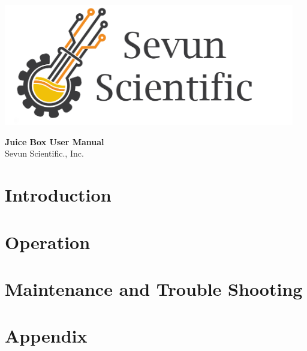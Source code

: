 \documentclass[letterpaper]{article}
\begin{document}
\date{\today}
\begin{titlingpage} %
	\centering
	\includegraphics[width=5in]{ssi_logo.png}
	\vspace{2cm}
\begin{flushleft}
	\begin{Huge}
		\textbf{Juice Box User Manual}\\
		\vspace{5mm}
		Sevun Scientific., Inc.
	\end{Huge}
\end{flushleft}
\vfill
\Large \thedate \par
\end{titlingpage} 

\newpage
\tableofcontents

\newpage
{} %
\setcounter{page}{1}

\section{Introduction}

 
\section{Operation}


\section{Maintenance and Trouble Shooting}


\section{Appendix}

\end{document}

